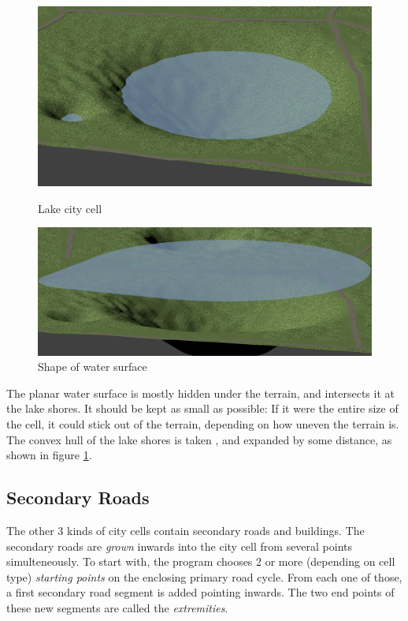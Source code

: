 \documentclass[a4paper,12pt]{scrartcl}
\begin{document}
\begin{figure}[h]
\center
\includegraphics[width=\textwidth]{lake.png}
\caption{Lake city cell}
\label{fig:lake}
\includegraphics[width=\textwidth]{lake_hull.png}
\caption{Shape of water surface}
\label{fig:lake_hull}
\end{figure}

The planar water surface is mostly hidden under the terrain, and intersects it at the lake shores. It should be kept as small as possible: If it were the entire size of the cell, it could stick out of the terrain, depending on how uneven the terrain is. The convex hull of the lake shores is taken , and expanded by some distance, as shown in figure \ref{fig:lake_hull}.


\subsection{Secondary Roads}
The other 3 kinds of city cells contain secondary roads and buildings. The secondary roads are \emph{grown} inwards into the city cell from several points simulteneously. To start with, the program chooses 2 or more (depending on cell type) \emph{starting points} on the enclosing primary road cycle. From each one of those, a first secondary road segment is added pointing inwards. The two end points of these new segments are called the \emph{extremities}.  
\end{document}
